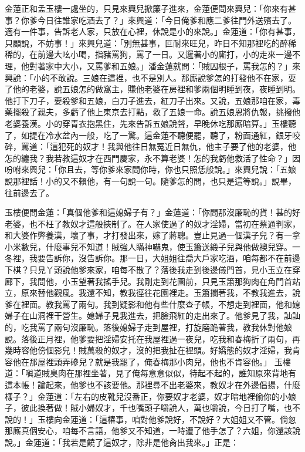 金蓮正和孟玉樓一處坐的，只見來興兒掀簾子進來，金蓮便問來興兒：「你來有甚事？你爹今日往誰家吃酒去了？」來興道：「今日俺爹和應二爹往門外送殯去了。適有一件事，告訴老人家，只放在心裡，休說是小的來說。」金蓮道：「你有甚事，只顧說，不妨事！」來興兒道：「別無甚事，叵耐來旺兒，昨日不知那裡吃的醉稀稀的，在前邊大吆小喝，指豬罵狗，罵了一日。又邏著小的廝打，小的走來一邊不理，他對著家中大小，又罵爹和五娘。」潘金蓮就問：「賊囚根子，罵我怎的？」來興說：「小的不敢說。三娘在這裡，也不是別人。那廝說爹怎的打發他不在家，耍了他的老婆，說五娘怎的做窩主，賺他老婆在房裡和爹兩個明睡到夜，夜睡到明。他打下刀子，要殺爹和五娘，白刀子進去，紅刀子出來。又說，五娘那咱在家，毒藥擺殺了親夫，多虧了他上東京去打點，救了五娘一命。說五娘恩將仇報，挑撥他老婆養漢。小的穿青衣抱黑住，先來告訴五娘說聲，早晚休吃那廝暗算。」玉樓聽了，如提在冷水盆內一般，吃了一驚。這金蓮不聽便罷，聽了，粉面通紅，銀牙咬碎，罵道：「這犯死的奴才！我與他往日無冤近日無仇，他主子要了他的老婆，他怎的纏我？我若教這奴才在西門慶家，永不算老婆！怎的我虧他救活了性命？」因吩咐來興兒：「你且去，等你爹來家問你時，你也只照恁般說。」來興兒說：「五娘說那裡話！小的又不賴他，有一句說一句。隨爹怎的問，也只是這等說。」說畢，往前邊去了。

玉樓便問金蓮：「真個他爹和這媳婦子有？」金蓮道：「你問那沒廉恥的貨！甚的好老婆，也不枉了教奴才這般挾制了。在人家使過了的奴才淫婦，當初在蔡通判家，和大婆作弊養漢，壞了事，才打發出來，嫁了蔣聰。豈止見過一個漢子兒？有一拿小米數兒，什麼事兒不知道！賊強人瞞神嚇鬼，使玉簫送緞子兒與他做襖兒穿。一冬裡，我要告訴你，沒告訴你。那一日，大姐姐往喬大戶家吃酒，咱每都不在前邊下棋？只見丫頭說他爹來家，咱每不散了？落後我走到後邊儀門首，見小玉立在穿廊下，我問他，小玉望著我搖手兒。我剛走到花園前，只見玉簫那狗肉在角門首站立，原來替他觀風。我還不知，教我徑往花園裡走。玉簫攔著我，不教我進去，說爹在裡面。教我罵了兩句。我到疑影和他有些什麼查子帳，不想走到裡面，他和媳婦子在山洞裡干營生。媳婦子見我進去，把臉飛紅的走出來了。他爹見了我，訕訕的，吃我罵了兩句沒廉恥。落後媳婦子走到屋裡，打旋磨跪著我，教我休對他娘說。落後正月裡，他爹要把淫婦安托在我屋裡過一夜兒，吃我和春梅折了兩句，再幾時容他傍個影兒！賊萬殺的奴才，沒的把我扯在裡頭。好嬌態的奴才淫婦，我肯容他在那屋裡頭弄磣兒？就是我罷了，俺春梅那小肉兒，他也不肯容他。」 玉樓道：「嗔道賊臭肉在那裡坐著，見了俺每意意似似，待起不起的，誰知原來背地有這本帳！論起來，他爹也不該要他。那裡尋不出老婆來，教奴才在外邊倡揚，什麼樣子？」金蓮道：「左右的皮靴兒沒番正，你要奴才老婆，奴才暗地裡偷你的小娘子，彼此換著做！賊小婦奴才，千也嘴頭子嚼說人，萬也嚼說，今日打了嘴，也不說的！」玉樓向金蓮道：「這椿事，咱對他爹說好，不說好？大姐姐又不管。倘忽那廝真個安心，咱每不言語，他爹又不知道，一時遭了他手怎了？六姐，你還該說說。」金蓮道：「我若是饒了這奴才，除非是他肏出我來。」正是：


